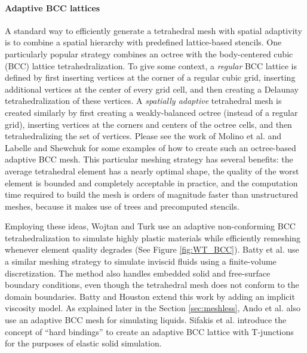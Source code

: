 \paragraph*{Adaptive BCC lattices} A standard way to efficiently generate a tetrahedral mesh with spatial adaptivity is to combine a spatial hierarchy with predefined lattice-based stencils. One particularly popular strategy combines an octree with the body-centered cubic (BCC) lattice tetrahedralization. To give some context, a {\em regular} BCC lattice is defined by first inserting vertices at the corner of a regular cubic grid, inserting additional vertices at the center of every grid cell, and then creating a Delaunay tetrahedralization of these vertices. A {\em spatially adaptive} tetrahedral mesh is created similarly by first creating a weakly-balanced octree (instead of a regular grid), inserting vertices at the corners and centers of the octree cells, and then tetrahedralizing the set of vertices. Please see the work of Molino et al. \cite{Molino2003} and Labelle and Shewchuk \cite{Labelle2007} for some examples of how to create such an octree-based adaptive BCC mesh. This particular meshing strategy has several benefits: the average tetrahedral element has a nearly optimal shape, the quality of the worst element is bounded and completely acceptable in practice, and the computation time required to build the mesh is orders of magnitude faster than unstructured meshes, because it makes use of trees and precomputed stencils.

Employing these ideas, Wojtan and Turk \cite{Wojtan2008} use an adaptive non-conforming BCC tetrahedralization to simulate highly plastic materials while efficiently remeshing whenever element quality degrades (See Figure \ref{fig:WT_BCC}). Batty et al. \cite{Batty2010} use a similar meshing strategy to simulate inviscid fluids using a finite-volume discretization. The method also handles embedded solid and free-surface boundary conditions, even though the tetrahedral mesh does not conform to the domain boundaries. Batty and Houston \cite{Batty2011} extend this work by adding an implicit viscosity model. As explained later in the Section \ref{sec:meshless}, Ando et al. \cite{Ando2013} also use an adaptive BCC mesh for simulating liquids. Sifakis et al. \cite{Sifakis2007} introduce the concept of ``hard bindings'' to create an adaptive BCC lattice with T-junctions for the purposes of elastic solid simulation.


